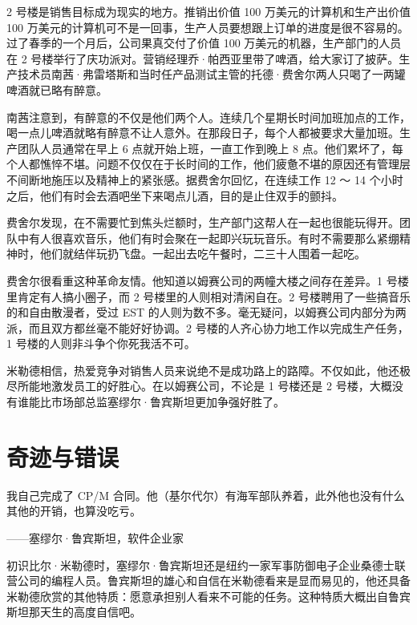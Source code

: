 \documentclass[12pt,UTF8]{ctexbook}
\begin{document}
2 号楼是销售目标成为现实的地方。推销出价值 100 万美元的计算机和生产出价值 100 万美元的计算机可不是一回事，生产人员要想跟上订单的进度是很不容易的。过了春季的一个月后，公司果真交付了价值 100 万美元的机器，生产部门的人员在 2 号楼举行了庆功派对。营销经理乔·帕西亚里带了啤酒，给大家订了披萨。生产技术员南茜·弗雷塔斯和当时任产品测试主管的托德·费舍尔两人只喝了一两罐啤酒就已略有醉意。

南茜注意到，有醉意的不仅是他们两个人。连续几个星期长时间加班加点的工作，喝一点儿啤酒就略有醉意不让人意外。在那段日子，每个人都被要求大量加班。生产团队人员通常在早上 6 点就开始上班，一直工作到晚上 8 点。他们累坏了，每个人都憔悴不堪。问题不仅仅在于长时间的工作，他们疲惫不堪的原因还有管理层不间断地施压以及精神上的紧张感。据费舍尔回忆，在连续工作 12 ～ 14 个小时之后，他们有时会去酒吧坐下来喝点儿酒，目的是止住双手的颤抖。

费舍尔发现，在不需要忙到焦头烂额时，生产部门这帮人在一起也很能玩得开。团队中有人很喜欢音乐，他们有时会聚在一起即兴玩玩音乐。有时不需要那么紧绷精神时，他们就结伴玩扔飞盘。一起出去吃午餐时，二三十人围着一起吃。

费舍尔很看重这种革命友情。他知道以姆赛公司的两幢大楼之间存在差异。1 号楼里肯定有人搞小圈子，而 2 号楼里的人则相对清闲自在。2 号楼聘用了一些搞音乐的和自由散漫者，受过 EST 的人则为数不多。毫无疑问，以姆赛公司内部分为两派，而且双方都丝毫不能好好协调。2 号楼的人齐心协力地工作以完成生产任务，1 号楼的人则非斗争个你死我活不可。

米勒德相信，热爱竞争对销售人员来说绝不是成功路上的路障。不仅如此，他还极尽所能地激发员工的好胜心。在以姆赛公司，不论是 1 号楼还是 2 号楼，大概没有谁能比市场部总监塞缪尔·鲁宾斯坦更加争强好胜了。





\section{奇迹与错误}


我自己完成了 CP/M 合同。他（基尔代尔）有海军部队养着，此外他也没有什么其他的开销，也算没吃亏。

——塞缪尔·鲁宾斯坦，软件企业家



初识比尔·米勒德时，塞缪尔·鲁宾斯坦还是纽约一家军事防御电子企业桑德士联营公司的编程人员。鲁宾斯坦的雄心和自信在米勒德看来是显而易见的，他还具备米勒德欣赏的其他特质：愿意承担别人看来不可能的任务。这种特质大概出自鲁宾斯坦那天生的高度自信吧。
\end{document}
